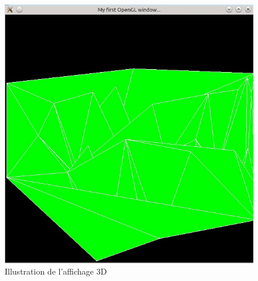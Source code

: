 \documentclass[10pt,a4paper]{report}
\begin{document}
\begin{figure}[h]
	\begin{center}
  		\includegraphics[scale=0.5]{3D.png} 
  	\end{center}
   	\caption{Illustration de l'affichage 3D}
	\label{Illustration de l'affichage 3D}
\end{figure}
\end{document}
